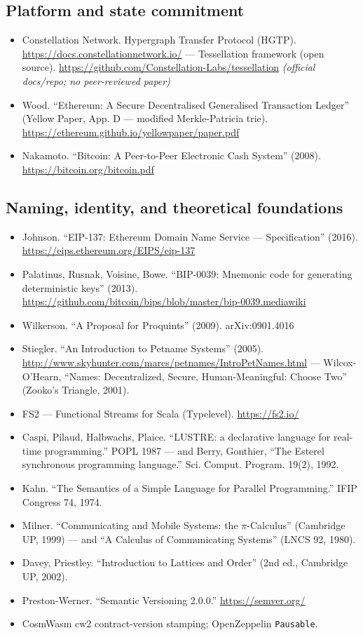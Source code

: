 \documentclass[11pt,a4paper]{article}
\begin{document}
\subsection*{Platform and state commitment}
\begin{itemize}
    \item Constellation Network. Hypergraph Transfer Protocol (HGTP). \url{https://docs.constellationnetwork.io/} --- Tessellation framework (open source). \url{https://github.com/Constellation-Labs/tessellation} \emph{(official docs/repo; no peer-reviewed paper)}
    \item Wood. ``Ethereum: A Secure Decentralised Generalised Transaction Ledger'' (Yellow Paper, App. D --- modified Merkle-Patricia trie). \url{https://ethereum.github.io/yellowpaper/paper.pdf}
    \item Nakamoto. ``Bitcoin: A Peer-to-Peer Electronic Cash System'' (2008). \url{https://bitcoin.org/bitcoin.pdf}
\end{itemize}

\subsection*{Naming, identity, and theoretical foundations}
\begin{itemize}
    \item Johnson. ``EIP-137: Ethereum Domain Name Service --- Specification'' (2016). \url{https://eips.ethereum.org/EIPS/eip-137}
    \item Palatinus, Rusnak, Voisine, Bowe. ``BIP-0039: Mnemonic code for generating deterministic keys'' (2013). \url{https://github.com/bitcoin/bips/blob/master/bip-0039.mediawiki}
    \item Wilkerson. ``A Proposal for Proquints'' (2009). arXiv:0901.4016
    \item Stiegler. ``An Introduction to Petname Systems'' (2005). \url{http://www.skyhunter.com/marcs/petnames/IntroPetNames.html} --- Wilcox-O'Hearn, ``Names: Decentralized, Secure, Human-Meaningful: Choose Two'' (Zooko's Triangle, 2001).
    \item FS2 --- Functional Streams for Scala (Typelevel). \url{https://fs2.io/}
    \item Caspi, Pilaud, Halbwachs, Plaice. ``LUSTRE: a declarative language for real-time programming.'' POPL 1987 --- and Berry, Gonthier, ``The Esterel synchronous programming language.'' Sci. Comput. Program. 19(2), 1992.
    \item Kahn. ``The Semantics of a Simple Language for Parallel Programming.'' IFIP Congress 74, 1974.
    \item Milner. ``Communicating and Mobile Systems: the $\pi$-Calculus'' (Cambridge UP, 1999) --- and ``A Calculus of Communicating Systems'' (LNCS 92, 1980).
    \item Davey, Priestley. ``Introduction to Lattices and Order'' (2nd ed., Cambridge UP, 2002).
    \item Preston-Werner. ``Semantic Versioning 2.0.0.'' \url{https://semver.org/}
    \item CosmWasm cw2 contract-version stamping; OpenZeppelin \texttt{Pausable}.
\end{itemize}
\end{document}
